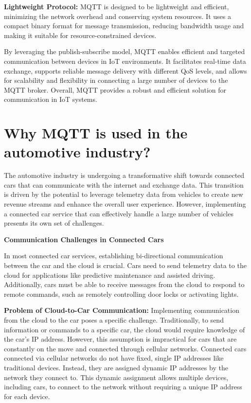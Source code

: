 \documentclass[
12pt,
oneside, 
onehalfspacing, 
nolistspacing, 
parskip, 
chapterinoneline, 
]{AASTCOMPUTER}
\begin{document}
\textbf{Lightweight Protocol:} MQTT is designed to be lightweight and efficient, minimizing the network overhead and conserving system resources. It uses a compact binary format for message transmission, reducing bandwidth usage and making it suitable for resource-constrained devices.

By leveraging the publish-subscribe model, MQTT enables efficient and targeted communication between devices in IoT environments. It facilitates real-time data exchange, supports reliable message delivery with different QoS levels, and allows for scalability and flexibility in connecting a large number of devices to the MQTT broker. Overall, MQTT provides a robust and efficient solution for communication in IoT systems.

\section{Why MQTT is used in the automotive industry?}
The automotive industry is undergoing a transformative shift towards connected cars that can communicate with the internet and exchange data. This transition is driven by the potential to leverage telemetry data from vehicles to create new revenue streams and enhance the overall user experience. However, implementing a connected car service that can effectively handle a large number of vehicles presents its own set of challenges.

\textbf{Communication Challenges in Connected Cars}

In most connected car services, establishing bi-directional communication between the car and the cloud is crucial. Cars need to send telemetry data to the cloud for applications like predictive maintenance and assisted driving. Additionally, cars must be able to receive messages from the cloud to respond to remote commands, such as remotely controlling door locks or activating lights.

\textbf{Problem of Cloud-to-Car Communication:}
Implementing communication from the cloud to the car poses a specific challenge. Traditionally, to send information or commands to a specific car, the cloud would require knowledge of the car's IP address. However, this assumption is impractical for cars that are constantly on the move and connected through cellular networks. Connected cars connected via cellular networks do not have fixed, single IP addresses like traditional devices. Instead, they are assigned dynamic IP addresses by the network they connect to. This dynamic assignment allows multiple devices, including cars, to connect to the network without requiring a unique IP address for each device.
\end{document}
